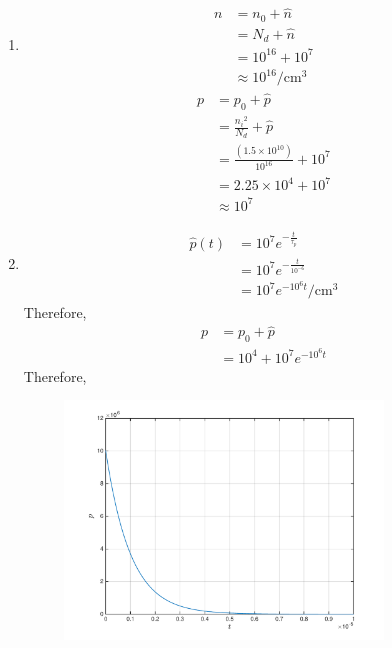 \documentclass[fleqn, a4paper, 11pt, oneside]{amsart}
\theoremstyle{definition}
\theoremstyle{theorem}
\begin{document}
\begin{solution}
	\begin{enumerate}[leftmargin=*]
		\item
			\begin{align*}
				n & = n_0 + \hat{n}  \\
                                  & = N_d + \hat{n}  \\
                                  & = 10^{16} + 10^7 \\
                                  & \approx 10^{16} \si{\per\centi\metre\cubed}
			\end{align*}
			\begin{align*}
				p & = p_0 + \hat{p}                                            \\
                                  & = \frac{{n_i}^2}{N_d} + \hat{p}                            \\
                                  & = \frac{\left( 1.5 \times 10^{10} \right)}{10^{16}} + 10^7 \\
                                  & = 2.25 \times 10^4 + 10^7                                  \\
                                  & \approx 10^7
			\end{align*}
		\item
			\begin{align*}
				\hat{p}(t) & = 10^7 e^{-\frac{t}{\tau_p}}  \\
                                           & = 10^7 e^{-\frac{t}{10^{-6}}} \\
                                           & = 10^7 e^{-10^6 t} \si{\per\centi\metre\cubed}
			\end{align*}
			Therefore,
			\begin{align*}
				p & = p_0 + \hat{p} \\
                                  & = 10^4 + 10^7 e^{-10^6 t}
			\end{align*}
			Therefore,
			\begin{figure}[H]
				\centering
				\includegraphics[width = 0.8\textwidth]{plot1.pdf}

\end{figure}
\end{enumerate}
\end{solution}
\end{document}
